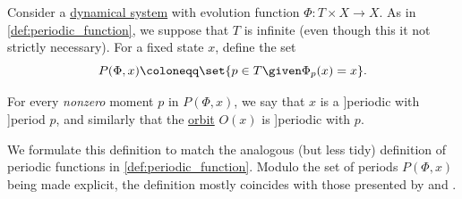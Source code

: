 \begin{definition}\label{def:dynamical_system_periodicity}\mimprovised
  Consider a \hyperref[def:dynamical_system]{dynamical system} with evolution function \( \Phi: T \times X \to X \). As in \cref{def:periodic_function}, we suppose that \( T \) is infinite (even though this it not strictly necessary). For a fixed state \( x \), define the set
  \begin{equation*}
    P(\Phi, x) \coloneqq \set{ p \in T \given \Phi_p(x) = x }.
  \end{equation*}

  For every \emph{nonzero} moment \( p \) in \( P(\Phi, x) \), we say that \( x \) is a \term[en=periodic (point) (\cite[def. 11(iii)]{GiuntiMazzola2012DynamicalSystemsOnMonoids}]{periodic} with \term[en=period (\cite[def. 11(ii)]{GiuntiMazzola2012DynamicalSystemsOnMonoids}]{period} \( p \), and similarly that the \hyperref[def:dynamical_system_trajectory]{orbit} \( O(x) \) is \term[en=periodic (orbit) (\cite[def. 12(i)]{GiuntiMazzola2012DynamicalSystemsOnMonoids}]{periodic} with  \( p \).
\end{definition}
\begin{comments}
  \item We formulate this definition to match the analogous (but less tidy) definition of periodic functions in \cref{def:periodic_function}. Modulo the set of periods \( P(\Phi, x) \) being made explicit, the definition mostly coincides with those presented by \textcite[def. 11(iii)]{GiuntiMazzola2012DynamicalSystemsOnMonoids} and \textcite[2]{BrinStuck2002DynamicalSystems}.
\end{comments}

